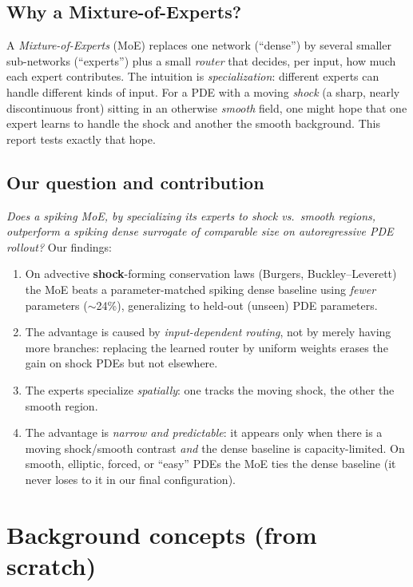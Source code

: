 \documentclass[11pt]{article}
\begin{document}
\subsection{Why a Mixture-of-Experts?}
A \emph{Mixture-of-Experts} (MoE) replaces one network (``dense'') by several smaller sub-networks
(``experts'') plus a small \emph{router} that decides, per input, how much each expert contributes.
The intuition is \emph{specialization}: different experts can handle different kinds of input. For a
PDE with a moving \emph{shock} (a sharp, nearly discontinuous front) sitting in an otherwise
\emph{smooth} field, one might hope that one expert learns to handle the shock and another the smooth
background. This report tests exactly that hope.

\subsection{Our question and contribution}
\emph{Does a spiking MoE, by specializing its experts to shock vs.\ smooth regions, outperform a
spiking dense surrogate of comparable size on autoregressive PDE rollout?} Our findings:
\begin{enumerate}[leftmargin=*,itemsep=2pt]
\item On advective \textbf{shock}-forming conservation laws (Burgers, Buckley--Leverett) the MoE
      beats a parameter-matched spiking dense baseline using \emph{fewer} parameters ($\sim$24\%),
      generalizing to held-out (unseen) PDE parameters.
\item The advantage is caused by \emph{input-dependent routing}, not by merely having more branches:
      replacing the learned router by uniform weights erases the gain on shock PDEs but not elsewhere.
\item The experts specialize \emph{spatially}: one tracks the moving shock, the other the smooth region.
\item The advantage is \emph{narrow and predictable}: it appears only when there is a moving
      shock/smooth contrast \emph{and} the dense baseline is capacity-limited. On smooth, elliptic,
      forced, or ``easy'' PDEs the MoE ties the dense baseline (it never loses to it in our final
      configuration).
\end{enumerate}

\section{Background concepts (from scratch)}\label{sec:bg}
\end{document}
